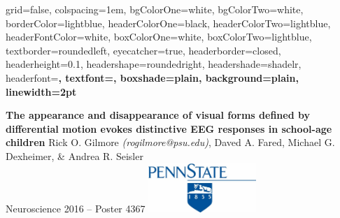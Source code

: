 \documentclass[landscape,final,paperwidth=72in,paperheight=42in,fontscale=0.285]{baposter}
\begin{document}


\begin{poster}%
  {
  grid=false,
  colspacing=1em,
  bgColorOne=white,
  bgColorTwo=white,
  borderColor=lightblue,
  headerColorOne=black,
  headerColorTwo=lightblue,
  headerFontColor=white,
  boxColorOne=white,
  boxColorTwo=lightblue,
  textborder=roundedleft,
  eyecatcher=true,
  headerborder=closed,
  headerheight=0.1\textheight,
  headershape=roundedright,
  headershade=shadelr,
  headerfont=\Large\bf\textsc, %
  textfont={\setlength{\parindent}{1.5em}},
  boxshade=plain,
  background=plain,
  linewidth=2pt
  }

  {\bf{The appearance and disappearance of visual forms defined by differential motion evokes distinctive EEG responses in school-age children}\vspace{0.2em}}
  {Rick O. Gilmore \emph{(rogilmore@psu.edu)}, Daved A. Fared, Michael G. Dexheimer, \& Andrea R. Seisler\\ \vspace{0.2em}
  Neuroscience 2016 -- Poster 4367}
  {\includegraphics[height=5em]{img/psu-logo-700-319.jpg}}



\end{poster}
\end{document}
